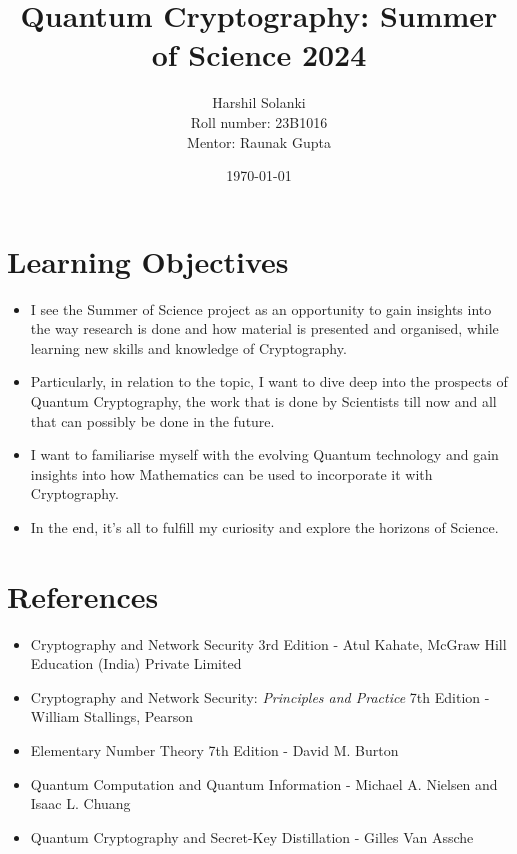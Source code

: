 \documentclass{article}
\begin{document}
\title{Quantum Cryptography: Summer of Science 2024}
\author{Harshil Solanki\\Roll number: 23B1016\\Mentor: Raunak Gupta}
\date{\today}
\maketitle

\section*{Learning Objectives}
\begin{itemize}
    \item I see the Summer of Science project as an opportunity to gain insights into the way research is done and how material is presented and organised, while learning new skills and knowledge of Cryptography.
    \item Particularly, in relation to the topic, I want to dive deep into the prospects of Quantum Cryptography, the work that is done by Scientists till now and all that can possibly be done in the future.
    \item I want to familiarise myself with the evolving Quantum technology  and gain insights into how Mathematics can be used to incorporate it with Cryptography.
    \item In the end, it's all to fulfill my curiosity and explore the horizons of Science.
\end{itemize}

\section*{References}
\begin{itemize}
    \item Cryptography and Network Security 3rd Edition - Atul Kahate, McGraw Hill Education (India) Private Limited
    \item Cryptography and Network Security: {\it Principles and Practice} 7th Edition - William Stallings, Pearson
    \item Elementary Number Theory 7th Edition - David M. Burton
    \item Quantum Computation and Quantum Information - Michael A. Nielsen and Isaac L. Chuang
    \item Quantum Cryptography and Secret-Key Distillation - Gilles Van Assche
\end{itemize}
\end{document}

